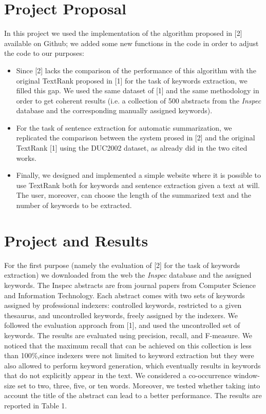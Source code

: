 \documentclass[twoside,twocolumn]{article}
\begin{document}
\section{Project Proposal}
In this project we used the implementation of the algorithm proposed in [2] available on Github; we added some new functions in the code in order to adjust the code to our purposes:
\begin{itemize}
\item Since [2] lacks the comparison of the performance of this algorithm with the original TextRank proposed in [1] for the task of keywords extraction, we filled this gap. We used the same dataset of [1] and the same methodology in order to get coherent results (i.e. a collection of 500 abstracts from the \textit{Inspec} database and the corresponding manually assigned keywords).
\end{itemize}
\begin{itemize}
\item For the task of sentence extraction for automatic summarization, we replicated the comparison between the system prosed in [2] and the original TextRank [1] using the DUC2002 dataset, as already did in the two cited works. 
\end{itemize}
\begin{itemize}
\item Finally, we designed and implemented a simple website where it is possible to use TextRank both for keywords and sentence extraction given a text at will. The user, moreover, can choose the length of the summarized text and the number of keywords to be extracted.
\end{itemize}
\section{Project and Results}
For the first purpose (namely the evaluation of [2] for the task of keywords extraction) we downloaded from the web the \textit{Inspec} database and the assigned keywords. The Inspec abstracts are from journal papers from Computer Science and Information Technology. Each abstract comes with two sets of keywords assigned by professional indexers: controlled keywords, restricted to a given thesaurus, and uncontrolled keywords, freely assigned by the indexers. We followed the evaluation approach from [1], and used the uncontrolled set of keywords. The results are evaluated using precision, recall, and F-measure. We noticed that the maximum recall that can be achieved on this collection is less than 100\%,since indexers were not limited to keyword extraction but they were also allowed to perform keyword generation, which eventually results in keywords that do not explicitly appear in the text. We considered a co-occurrence window-size set to two, three, five, or ten words. Moreover, we tested whether taking into account the title of the abstract can lead to a better performance. The results are reported in Table 1. 
\end{document}
